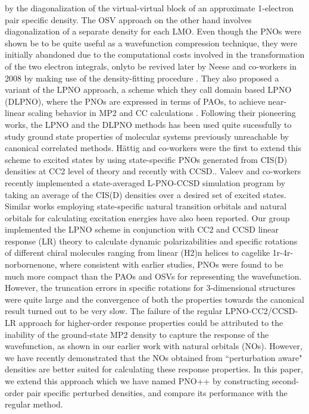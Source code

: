 by the diagonalization of the virtual-virtual block of an approximate 1-electron pair specific density. 
The OSV approach on the other hand involves diagonalization of a separate density for each LMO. Even though 
the PNOs were shown be to be quite useful as a wavefunction compression technique, they were initially 
abandoned due to the computational costs involved in the transformation of the two electron 
integrals, onlyto be revived later by Neese and co-workers in 2008 by making use of the density-fitting procedure
\cite{Neese09,NeeseCCSD09}. They also proposed a variant of the LPNO approach, a scheme which they call domain based LPNO (DLPNO), 
where the PNOs are expressed in terms of PAOs, to achieve near-linear scaling behavior in MP2 and CC calculations
\cite{Riplinger16}. Following their pioneering works, the LPNO and the DLPNO methods has been used quite sucessfully to study 
ground state properties of molecular systems previously unreachable by canonical correlated methods. 
H{\"a}ttig and co-workers were the first to extend this scheme to excited states by using state-specific 
PNOs generated from CIS(D) densities at CC2 level of theory\cite{Hattig13} and recently with CCSD.\cite{Hattig18}. Valeev and 
co-workers\cite{Chong18} recently implemented a state-averaged L-PNO-CCSD simulation program by taking an average of the 
CIS(D) densities over a desired set of excited states. Similar works employing state-specific natural 
transition orbitals and natural orbitals for calculating excitation energies have also been reported\cite{Mester17,Mester18,Baudin17,HofenerKlopper17}. 
Our group implemented the LPNO scheme in conjunction with CC2 and CCSD linear response (LR) theory  
to calculate dynamic polarizabilities and specific rotations of different chiral molecules ranging from linear
(H2)n helices to cagelike 1r-4r-norbornenone, where consistent with earlier studies, PNOs were found
to be much more compact than the PAOs and OSVs for representing the wavefunction. However, the truncation errors 
in specific rotations for 3-dimensional structures were quite large and the convergence of both the properties 
towards the canonical result turned out to be very slow\cite{McAlexander15:LRCC}. The failure of the regular LPNO-CC2/CCSD-LR approach
for higher-order response properties could be attributed to the inability of the ground-state MP2 density to 
capture the response of the wavefunction, as shown in our earlier work with natural orbitals (NOs)\cite{Kumar17}. However,
we have recently demonstrated that the NOs obtained from ``perturbation aware" densities are better suited
for calculating these response properties.\cite{Kumar18:1} In this paper, we extend this approach which we have named 
PNO++ by constructing second-order pair specific perturbed densities, and compare its performance with 
the regular method.
